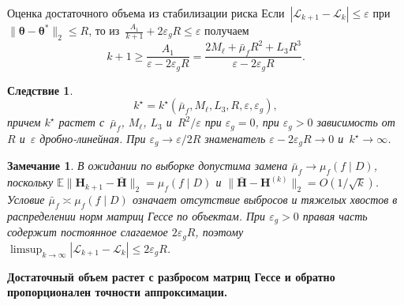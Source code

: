 \documentclass[9pt,pdf,hyperref={unicode}]{beamer}
\newtheorem{rusremark}{Замечание}
\newtheorem{ruscorollary}{Следствие}
\newcommand{\key}[1]{\par\vspace{0.5ex}\noindent\textbf{\color{darkgreen}#1}}
\begin{document}
\begin{frame}{Оценка достаточного объема из стабилизации риска}
\justifying
\small
Если~$|\mathcal{L}_{k+1}-\mathcal{L}_k|\le\varepsilon$ при~$\|\boldsymbol{\theta}-\boldsymbol{\theta}^*\|_2\le R$, то из~$\frac{A_1}{k+1}+2\varepsilon_gR\le\varepsilon$ получаем
\[
    k+1\ge\frac{A_1}{\varepsilon-2\varepsilon_gR}=\frac{2M_\ell+\bar\mu_fR^2+L_3R^3}{\varepsilon-2\varepsilon_gR}.
\]
\begin{ruscorollary}
    \[
        k^\star=k^\star(\bar\mu_f,M_\ell,L_3,R,\varepsilon,\varepsilon_g),
    \]
    причем $k^\star$ растет с~$\bar\mu_f$, $M_\ell$, $L_3$ и~$R^2/\varepsilon$ при $\varepsilon_g=0$, при $\varepsilon_g>0$ зависимость от~$R$ и~$\varepsilon$ дробно-линейная. При $\varepsilon_g\to\varepsilon/2R$ знаменатель $\varepsilon-2\varepsilon_gR\to0$ и~$k^\star\to\infty$.
\end{ruscorollary}
\begin{rusremark}
    В ожидании по выборке допустима замена $\bar\mu_f\to\mu_f(f\mid D)$, поскольку $\mathbb{E}\|\mathbf{H}_{k+1}-\bar{\mathbf{H}}\|_2=\mu_f(f\mid D)$ и $\|\bar{\mathbf{H}}-\mathbf{H}^{(k)}\|_2=O(1/\sqrt{k})$. Условие $\bar\mu_f\asymp\mu_f(f\mid D)$ означает отсутствие выбросов и тяжелых хвостов в распределении норм матриц Гессе по объектам. При $\varepsilon_g>0$ правая часть содержит постоянное слагаемое $2\varepsilon_gR$, поэтому $\limsup_{k\to\infty}|\mathcal{L}_{k+1}-\mathcal{L}_k|\le 2\varepsilon_gR$.
\end{rusremark}
\key{Достаточный объем растет с разбросом матриц Гессе и обратно пропорционален точности аппроксимации.}
\end{frame}
\end{document}
